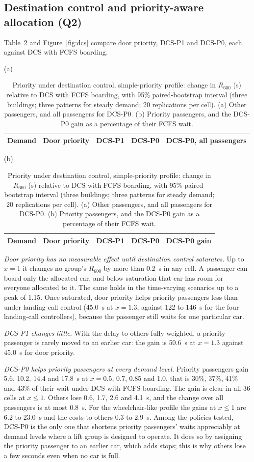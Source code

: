 \documentclass[12pt,a4paper]{article}
\begin{document}
\subsection{Destination control and priority-aware allocation (Q2)}\label{sec:res-dcs}
Table~\ref{tab:dcs} and Figure~\ref{fig:dcs} compare door priority, DCS-P1 and DCS-P0, each against DCS with FCFS boarding.

\begin{table}[htbp]\centering
\caption{Priority under destination control, simple-priority profile: change in $R_{600}$ (s) relative to DCS with FCFS boarding, with 95\% paired-bootstrap interval (three buildings; three patterns for steady demand; 20 replications per cell). (a) Other passengers, and all passengers for DCS-P0. (b) Priority passengers, and the DCS-P0 gain as a percentage of their FCFS wait.}\label{tab:dcs}
\footnotesize
(a)\\[2pt]
\begin{tabular}{@{}lrrrr@{}}
\toprule Demand & Door priority & DCS-P1 & DCS-P0 & DCS-P0, all passengers\\\midrule

\end{tabular}

\medskip (b)\\[2pt]
\begin{tabular}{@{}lrrrr@{}}
\toprule Demand & Door priority & DCS-P1 & DCS-P0 & DCS-P0 gain\\\midrule

\end{tabular}
\end{table}

\emph{Door priority has no measurable effect until destination control saturates.} Up to $x=1$ it changes no group's $R_{600}$ by more than 0.2~s in any cell. A passenger can board only the allocated car, and below saturation that car has room for everyone allocated to it. The same holds in the time-varying scenarios up to a peak of 1.15. Once saturated, door priority helps priority passengers less than under landing-call control (45.0~s at $x=1.3$, against 122 to 146~s for the four landing-call controllers), because the passenger still waits for one particular car.

\emph{DCS-P1 changes little.} With the delay to others fully weighted, a priority passenger is rarely moved to an earlier car: the gain is 50.6~s at $x=1.3$ against 45.0~s for door priority.

\emph{DCS-P0 helps priority passengers at every demand level.} Priority passengers gain 5.6, 10.2, 14.4 and 17.8~s at $x=0.5$, 0.7, 0.85 and 1.0, that is 30\%, 37\%, 41\% and 43\% of their wait under DCS with FCFS boarding. The gain is clear in all 36 cells at $x\le1$. Others lose 0.6, 1.7, 2.6 and 4.1~s, and the change over all passengers is at most 0.8~s. For the wheelchair-like profile the gains at $x\le1$ are 6.2 to 23.0~s and the costs to others 0.3 to 2.9~s. Among the policies tested, DCS-P0 is the only one that shortens priority passengers' waits appreciably at demand levels where a lift group is designed to operate. It does so by assigning the priority passenger to an earlier car, which adds stops; this is why others lose a few seconds even when no car is full.
\end{document}

